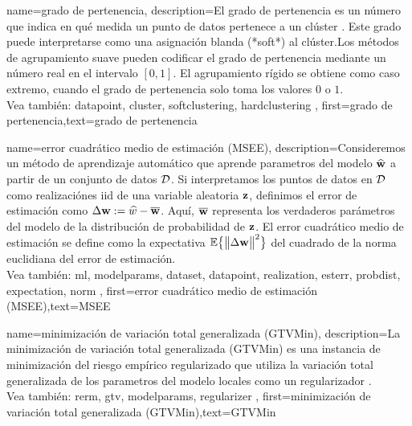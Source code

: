 {name={grado de pertenencia},
	description={El grado de pertenencia es un número que indica en qué medida un punto de datos 
		pertenece a un clúster \cite[Ch. 8]{MLBasics}. Este grado puede interpretarse 
		como una asignación blanda (*soft*) al clúster.Los métodos de agrupamiento suave
		pueden codificar el grado de pertenencia mediante un número real en el intervalo $[0,1]$. 
		El agrupamiento rígido se obtiene como caso extremo, cuando el grado de pertenencia solo toma los valores $0$ o $1$.
		\\
		Vea también: \gls{datapoint}, \gls{cluster}, \Gls{softclustering}, \Gls{hardclustering} }, 
		first={grado de pertenencia},text={grado de pertenencia} 
}

{name={error cuadrático medio de estimación (MSEE)},
	description={Consideremos un método de aprendizaje automático que aprende 
		parametros del modelo $\widehat{{\bf w}}$ a partir de un conjunto de datos $\mathcal{D}$. 
		Si interpretamos los puntos de datos en $\mathcal{D}$ como realizaciónes iid de una variable aleatoria ${\bf z}$, 
		definimos el error de estimación como $\Delta {\bf w} := \widehat{w} - \overline{{\bf w}}$. 
		Aquí, $\overline{{\bf w}}$ representa los verdaderos parámetros del modelo de la distribución de probabilidad 
		de ${\bf z}$. El error cuadrático medio de estimación se define como la expectativa $\mathbb{E} \big\{ \big\| \Delta {\bf w} \big\|^{2} \big\}$ del cuadrado de la 
		norma euclidiana del error de estimación\cite{LC,kay}.
		\\
		Vea también: \gls{ml}, \gls{modelparams}, \gls{dataset}, \gls{datapoint}, \gls{realization}, \gls{esterr}, \gls{probdist}, \gls{expectation}, \gls{norm} },
	first={error cuadrático medio de estimación (MSEE)},text={MSEE} 
}

{name={minimización de variación total generalizada (GTVMin)},
	description={La minimización de variación total generalizada (GTVMin) es una instancia de minimización del riesgo empírico regularizado
	que utiliza la variación total generalizada de los parametros del modelo locales como un regularizador \cite{ClusteredFLTVMinTSP}.
	\\
		Vea también: \gls{rerm}, \gls{gtv}, \gls{modelparams}, \gls{regularizer} },
	first={minimización de variación total generalizada (GTVMin)},text={GTVMin} 
}

